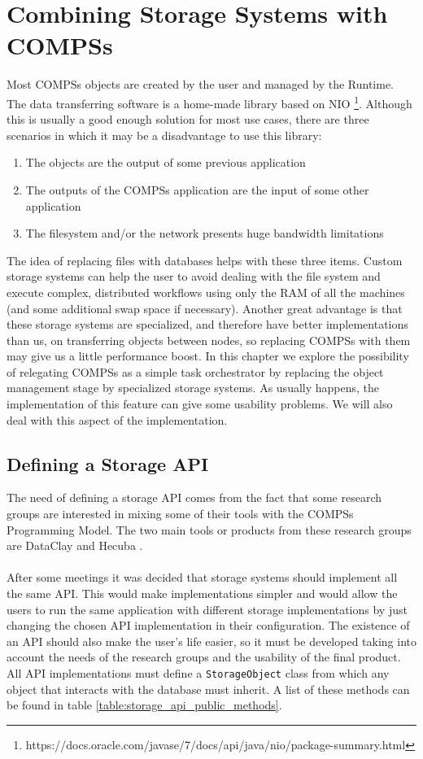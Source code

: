 \section{Combining Storage Systems with COMPSs}
\label{sec:storage}
Most COMPSs objects are created by the user and managed by the Runtime. The data transferring software is a home-made library based on NIO \footnote{https://docs.oracle.com/javase/7/docs/api/java/nio/package-summary.html}. Although this is usually a good enough solution for most use cases, there are three scenarios in which it may be a disadvantage to use this library:

\begin{enumerate}
\item The objects are the output of some previous application
\item The outputs of the COMPSs application are the input of some other application
\item The filesystem and/or the network presents huge bandwidth limitations
\end{enumerate}

The idea of replacing files with databases helps with these three items. Custom storage systems can help the user to avoid dealing with the file system and execute complex, distributed workflows using only the RAM of all the machines (and some additional swap space if necessary). Another great advantage is that these storage systems are specialized, and therefore have better implementations than us, on transferring objects between nodes, so replacing COMPSs with them may give us a little performance boost. In this chapter we explore the possibility of relegating COMPSs as a simple task orchestrator by replacing the object management stage by specialized storage systems. As usually happens, the implementation of this feature can give some usability problems. We will also deal with this aspect of the implementation.


\subsection{Defining a Storage API}
\label{subsec:storage_api}
The need of defining a storage API comes from the fact that some research groups are interested in mixing some of their tools with the COMPSs Programming Model. The two main tools or products from these research groups are DataClay \cite{DataClay} and Hecuba \cite{alomar2015hecuba}.\\
\\
After some meetings it was decided that storage systems should implement all the same API. This would make implementations simpler and would allow the users to run the same application with different storage implementations by just changing the chosen API implementation in their configuration. The existence of an API should also make the user's life easier, so it must be developed taking into account the needs of the research groups and the usability of the final product. All API implementations must define a \verb|StorageObject| class from which any object that interacts with the database must inherit. A list of these methods can be found in table \ref{table:storage_api_public_methods}.

